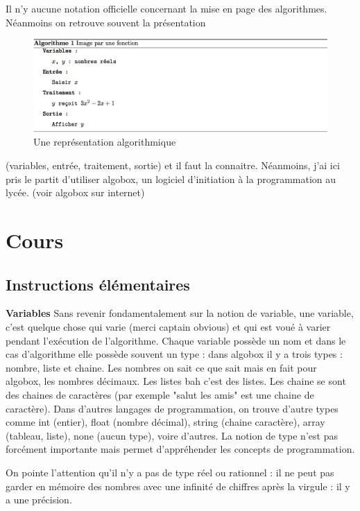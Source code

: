 \begin{remarque}
Il n'y aucune notation officielle concernant la mise en page des algorithmes. Néanmoins on retrouve souvent la présentation
\begin{figure}[H]
\includegraphics[scale=0.4]{images/autreforme.png}
\caption{Une représentation algorithmique}
\end{figure}
(variables, entrée, traitement, sortie) et il faut la connaitre. Néanmoins, j'ai ici pris le partit d'utiliser algobox, un logiciel d'initiation à la programmation au lycée. (voir algobox sur internet)
\end{remarque}
\section{Cours}
\subsection{Instructions élémentaires}
\textbf{Variables}\newline
Sans revenir fondamentalement sur la notion de variable, une variable, c'est quelque chose qui varie (merci captain obvious) et qui est voué à varier pendant l'exécution de l'algorithme. Chaque variable possède un nom et dans le cas d'algorithme elle possède souvent un type : dans algobox il y a trois types : nombre, liste et chaine. Les nombres on sait ce que sait mais en fait pour algobox, les nombres décimaux. Les listes bah c'est des listes. Les chaine se sont des chaines de caractères (par exemple "salut les amis" est une chaine de caractère). Dans d'autres langages de programmation, on trouve d'autre types comme int (entier), float (nombre décimal), string (chaine caractère), array (tableau, liste), none (aucun type), voire d'autres. La notion de type n'est pas forcément importante mais permet d'appréhender les concepts de programmation. \newline

On pointe l'attention qu'il n'y a pas de type réel ou rationnel : il ne peut pas garder en mémoire des nombres avec une infinité de chiffres après la virgule : il y a une précision.\newline


